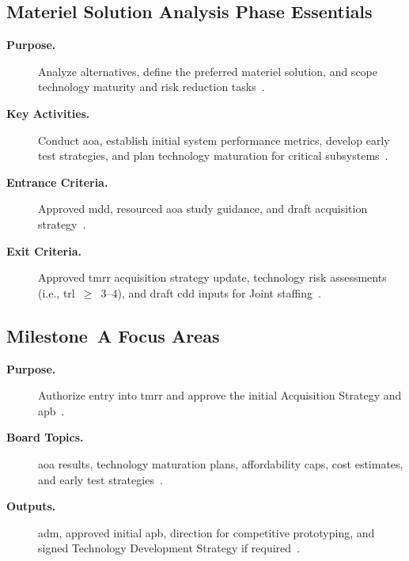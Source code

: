 \documentclass[../main.tex]{subfiles}
\begin{document}
\subsection{Materiel Solution Analysis Phase Essentials}
\begin{description}
  \item[\textbf{Purpose.}] Analyze alternatives, define the preferred materiel solution, and scope technology maturity and risk reduction tasks~\autocite{DoDI5000-85}.
  \item[\textbf{Key Activities.}] Conduct \ac{aoa}, establish initial system performance metrics, develop early test strategies, and plan technology maturation for critical subsystems~\autocite{DoDI5000-85}.
  \item[\textbf{Entrance Criteria.}] Approved \ac{mdd}, resourced \ac{aoa} study guidance, and draft acquisition strategy~\autocite{DoDI5000-02}.
  \item[\textbf{Exit Criteria.}] Approved \ac{tmrr} acquisition strategy update, technology risk assessments (i.e., \ac{trl}~$\geq$~3--4), and draft \ac{cdd} inputs for Joint staffing~\autocite{DoDI5000-85}.
\end{description}

\subsection{Milestone~A Focus Areas}
\begin{description}
  \item[\textbf{Purpose.}] Authorize entry into \ac{tmrr} and approve the initial Acquisition Strategy and \ac{apb}~\autocite{DoDI5000-85}.
  \item[\textbf{Board Topics.}] \ac{aoa} results, technology maturation plans, affordability caps, cost estimates, and early test strategies~\autocite{DoDI5000-85}.
  \item[\textbf{Outputs.}] \ac{adm}, approved initial \ac{apb}, direction for competitive prototyping, and signed Technology Development Strategy if required~\autocite{DoDI5000-85}.
\end{description}
\end{document}
